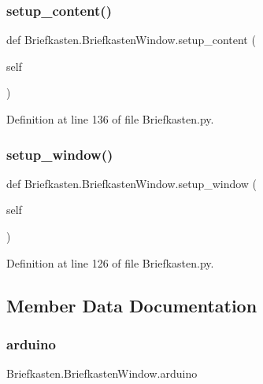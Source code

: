 \subsubsection{\texorpdfstring{setup\+\_\+content()}{setup\_content()}}
{\footnotesize\ttfamily def Briefkasten.\+Briefkasten\+Window.\+setup\+\_\+content (\begin{DoxyParamCaption}\item[{}]{self }\end{DoxyParamCaption})}



Definition at line 136 of file Briefkasten.\+py.

\mbox{\label{class_briefkasten_1_1_briefkasten_window_aee85e8964104d0b0e06cda63d386b367}} 
\subsubsection{\texorpdfstring{setup\+\_\+window()}{setup\_window()}}
{\footnotesize\ttfamily def Briefkasten.\+Briefkasten\+Window.\+setup\+\_\+window (\begin{DoxyParamCaption}\item[{}]{self }\end{DoxyParamCaption})}



Definition at line 126 of file Briefkasten.\+py.



\subsection{Member Data Documentation}
\mbox{\label{class_briefkasten_1_1_briefkasten_window_ad61bca445900cbd6887c8d31251c867a}} 
\subsubsection{\texorpdfstring{arduino}{arduino}}
{\footnotesize\ttfamily Briefkasten.\+Briefkasten\+Window.\+arduino}



